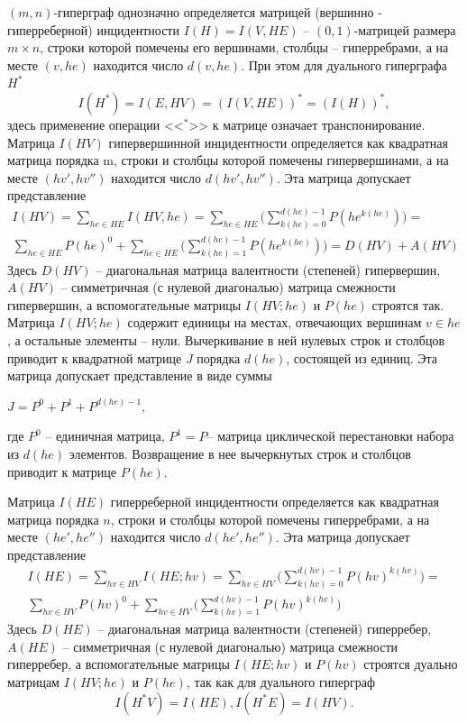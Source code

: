 $(m,n)$-гиперграф однозначно определяется матрицей (вершинно - гиперреберной) инцидентности $I(H)=I(V,HE)$ -- $(0,1)$-матрицей размера $m\times n$, строки которой помечены его вершинами, столбцы -- гиперребрами, а на месте $(v,he)$ находится число $d(v,he)$. При этом для дуального гиперграфа $H^*$
$$I(H^*)=I(E,HV)=(I(V,HE))^*=(I(H))^*,$$
здесь применение операции <<$^*$>> к матрице означает транспонирование. 
Матрица $I(HV)$ гипервершинной инцидентности определяется как квадратная матрица порядка m, строки и столбцы которой помечены гипервершинами, а на месте $(hv',hv'')$ находится число $d(hv',hv'')$. Эта матрица допускает представление
\begin{equation} \label{eq:inhyper}
\begin{split}
I(HV) = \sum \limits_{he \in HE} I(HV,he)=\sum \limits_{he \in HE} \Big( \sum \limits_{k(he)=0}^{d(he)-1}P(he^{k(he)}) \Big)=\\ \sum \limits_{he \in HE} P(he)^{0} + \sum \limits_{he\in HE} \Big( \sum \limits_{k(he)=1}^{d(he)-1}P(he^{k(he)}) \Big) = D(HV)+A(HV)
\end{split}
\end{equation}
Здесь $D(HV)$ -- диагональная матрица валентности (степеней) гипервершин, $A(HV)$ -- симметричная (с нулевой диагональю) матрица смежности гипервершин, а вспомогательные матрицы $I(HV;he)$ и $P(he)$ строятся так. Матрица $I(HV;he)$ содержит единицы на местах, отвечающих вершинам $v \in he$, а остальные элементы -- нули. Вычеркивание в ней нулевых строк и столбцов приводит к квадратной матрице $J$ порядка $d(he)$, состоящей из единиц. Эта матрица допускает представление в виде суммы
\\
\vspace{-0.6cm}
\begin{center}
$J=P^0+P^1+P^{d(he)-1},$
\end{center}
где $P^0$ -- единичная матрица, $P^1=P$-- матрица циклической перестановки набора из $d(he)$ элементов. Возвращение в нее вычеркнутых строк и столбцов приводит к матрице $P(he)$.

Матрица $I(HE)$ гиперреберной инцидентности определяется как квадратная матрица порядка $n$, строки и столбцы которой помечены гиперребрами, а на месте $(he',he'')$ находится число $d(he',he'')$. Эта матрица допускает представление
\begin{equation} \label{eq:inhyperedges}
\begin{split}
	I(HE) = \sum \limits_{hv \in HV}I(HE;hv) = \sum \limits_{hv\in HV}\Big( \sum \limits_{k(hv)=0}^{d(hv)-1}P(hv)^{k(hv)} \Big)=\\ \sum \limits_{hv \in HV} P(hv)^0 + \sum \limits_{hv\in HV}\Big( \sum \limits_{k(hv)=1}^{d(hv)-1}P(hv)^{k(hv)} \Big)
\end{split}
\end{equation}
Здесь $D(HE)$ -- диагональная матрица валентности (степеней) гиперребер, $A(HE)$ -- симметричная (с нулевой диагональю) матрица смежности гиперребер, а вспомогательные матрицы $I(HE;hv)$ и $P(hv)$ строятся дуально матрицам $I(HV;he)$ и $P(he)$, так как для дуального гиперграф $$I(H^*V) = I(HE), I(H^*E)=I(HV).$$

